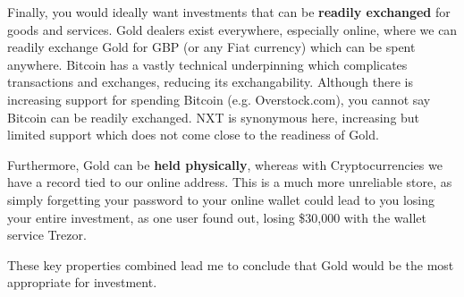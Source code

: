 \documentclass[11pt]{article}
\begin{document}
	Finally, you would ideally want investments that can be \textbf{readily exchanged} for goods and services. Gold dealers exist everywhere, especially online, where we can readily exchange Gold for GBP (or any Fiat currency) which can be spent anywhere. Bitcoin has a vastly technical underpinning which complicates transactions and exchanges, reducing its exchangability. Although there is increasing support for spending Bitcoin (e.g. Overstock.com), you cannot say Bitcoin can be readily exchanged. NXT is synonymous here, increasing but limited support which does not come close to the readiness of Gold. \newline
	
	Furthermore, Gold can be \textbf{held physically}, whereas with Cryptocurrencies we have a record tied to our online address. This is a much more unreliable store, as simply forgetting your password to your online wallet could lead to you losing your entire investment, as one user found out, losing \$30,000 with the wallet service Trezor. \newline
	
	These key properties combined lead me to conclude that Gold would be the most appropriate for investment.
	\newline \newline \newline
	
\end{document}
